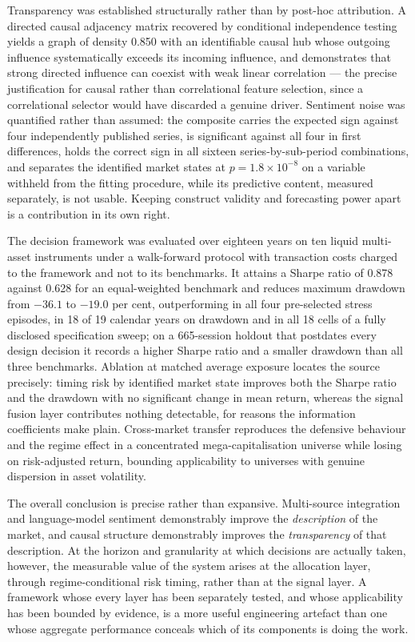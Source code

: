 Transparency was established structurally rather than by post-hoc attribution. A directed causal
adjacency matrix recovered by conditional independence testing yields a graph of density 0.850 with
an identifiable causal hub whose outgoing influence systematically exceeds its incoming influence,
and demonstrates that strong directed influence can coexist with weak linear correlation --- the
precise justification for causal rather than correlational feature selection, since a correlational
selector would have discarded a genuine driver. Sentiment noise was quantified rather than assumed:
the composite carries the expected sign against four independently published series, is significant
against all four in first differences, holds the correct sign in all sixteen series-by-sub-period
combinations, and separates the identified market states at $p = 1.8 \times 10^{-8}$ on a variable
withheld from the fitting procedure, while its predictive content, measured separately, is not
usable. Keeping construct validity and forecasting power apart is a contribution in its own right.

The decision framework was evaluated over eighteen years on ten liquid multi-asset instruments
under a walk-forward protocol with transaction costs charged to the framework and not to its
benchmarks. It attains a Sharpe ratio of 0.878 against 0.628 for an equal-weighted benchmark and
reduces maximum drawdown from $-36.1$ to $-19.0$ per cent, outperforming in all four pre-selected
stress episodes, in 18 of 19 calendar years on drawdown and in all 18 cells of a fully disclosed
specification sweep; on a 665-session holdout that postdates every design decision it records a
higher Sharpe ratio and a smaller drawdown than all three benchmarks. Ablation at matched average
exposure locates the source precisely: timing risk by identified market state improves both the
Sharpe ratio and the drawdown with no significant change in mean return, whereas the signal fusion
layer contributes nothing detectable, for reasons the information coefficients make plain.
Cross-market transfer reproduces the defensive behaviour and the regime effect in a concentrated
mega-capitalisation universe while losing on risk-adjusted return, bounding applicability to
universes with genuine dispersion in asset volatility.

The overall conclusion is precise rather than expansive. Multi-source integration and
language-model sentiment demonstrably improve the \emph{description} of the market, and causal
structure demonstrably improves the \emph{transparency} of that description. At the horizon and
granularity at which decisions are actually taken, however, the measurable value of the system
arises at the allocation layer, through regime-conditional risk timing, rather than at the signal
layer. A framework whose every layer has been separately tested, and whose applicability has been
bounded by evidence, is a more useful engineering artefact than one whose aggregate performance
conceals which of its components is doing the work.

